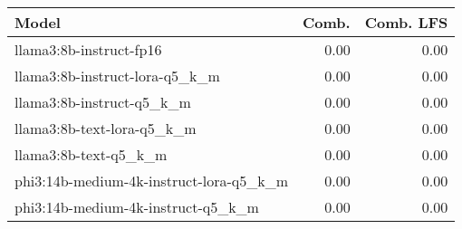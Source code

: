 \begin{tabular}{lrr}
\toprule
Model & Comb. & Comb. LFS \\
\midrule
llama3:8b-instruct-fp16 & 0.00 & 0.00 \\
llama3:8b-instruct-lora-q5\_k\_m & 0.00 & 0.00 \\
llama3:8b-instruct-q5\_k\_m & 0.00 & 0.00 \\
llama3:8b-text-lora-q5\_k\_m & 0.00 & 0.00 \\
llama3:8b-text-q5\_k\_m & 0.00 & 0.00 \\
phi3:14b-medium-4k-instruct-lora-q5\_k\_m & 0.00 & 0.00 \\
phi3:14b-medium-4k-instruct-q5\_k\_m & 0.00 & 0.00 \\
\bottomrule
\end{tabular}

